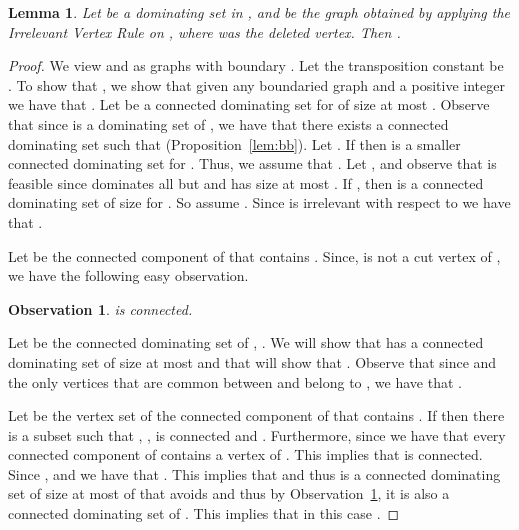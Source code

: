 \documentclass[11pt]{article}
\newtheorem{observation}{Observation}
\newtheorem{lemma}{Lemma}
\begin{document}
 \begin{lemma}
 \label{lem:condomseteqiv1}
Let  be a dominating set in , and  be the graph obtained by applying the Irrelevant Vertex Rule on , where  was the deleted vertex.  Then . 
\end{lemma}
 \begin{proof}
 We view  and  as graphs with boundary . Let the transposition constant be . To show that , we show that given any boundaried graph  and a positive 
 integer  we have that .  Let   be a connected dominating set for  of size at most .  Observe that since  is a dominating set of , we have that there exists a connected dominating set   such that  (Proposition~\ref{lem:bb}). Let . If  then 
   is a smaller connected dominating set for . Thus, we assume that 
  .  Let , and observe that  is feasible since  dominates all but  and has size at  most . If , then  is a connected dominating set of size  for .  So assume . Since  is irrelevant with respect to  we have that . 

  



Let  be the connected component of  that contains .  Since,  is not a cut vertex of , we have the following easy observation. 

\begin{observation}
\label{claim:wisokay}
 is connected. 
\end{observation}


Let  be the connected dominating set of , . 
We will show that  has a connected dominating set of size at most  and that will show that 
.   Observe that since  and the only vertices that are common between  and  belong to , we have that 
. 

Let  be the vertex set of the connected component of  that contains . 
If  then there is a subset  such that , ,  is connected and 
.  Furthermore, since  we have that every connected component of  contains a vertex of . This implies that   is connected. Since ,  and  we have that . This implies that 
 and thus  is a connected dominating set of size at most  of  that avoids  and thus by Observation~\ref{claim:wisokay}, it  is also a connected dominating set of . This implies that in this case .   








\end{proof}
\end{document}
